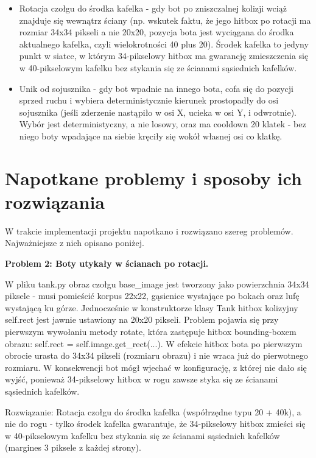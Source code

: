 \begin{itemize}
\item Rotacja czołgu do środka kafelka - gdy bot po zniszczalnej kolizji wciąż znajduje się wewnątrz ściany 
(np. wskutek faktu, że jego hitbox po rotacji ma rozmiar 34x34 pikseli a nie 20x20, pozycja bota jest wyciągana do środka 
aktualnego kafelka, czyli wielokrotności 40 plus 20). Środek kafelka to jedyny punkt w siatce, w którym 34-pikselowy hitbox 
ma gwarancję zmieszczenia się w 40-pikselowym kafelku bez stykania się ze ścianami sąsiednich kafelków.
\item Unik od sojusznika - gdy bot wpadnie na innego bota, cofa się do pozycji sprzed ruchu i wybiera deterministycznie 
kierunek prostopadły do osi sojusznika (jeśli zderzenie nastąpiło w osi X, ucieka w osi Y, i odwrotnie). Wybór 
jest deterministyczny, a nie losowy, oraz ma cooldown 20 klatek - bez niego boty wpadające na siebie kręciły się 
wokół własnej osi co klatkę.
\end{itemize}

\section{Napotkane problemy i sposoby ich rozwiązania}

W trakcie implementacji projektu napotkano i rozwiązano szereg problemów. Najważniejsze z nich opisano poniżej.
 
\textbf{Problem 2: Boty utykały w ścianach po rotacji.} 

W pliku tank.py obraz czołgu base\_image jest tworzony 
jako powierzchnia 34x34 piksele - musi pomieścić korpus 22x22, gąsienice wystające po bokach oraz lufę wystającą ku górze. 
Jednocześnie w konstruktorze klasy Tank hitbox kolizyjny self.rect jest jawnie ustawiony na 20x20 pikseli. 
Problem pojawia się przy pierwszym wywołaniu metody rotate, która zastępuje hitbox bounding-boxem obrazu: 
self.rect = self.image.get\_rect(...). W efekcie hitbox bota po pierwszym obrocie urasta do 34x34 pikseli 
(rozmiaru obrazu) i nie wraca już do pierwotnego rozmiaru. W konsekwencji bot mógł wjechać w konfigurację, 
z której nie dało się wyjść, ponieważ 34-pikselowy hitbox w rogu zawsze styka się 
ze ścianami sąsiednich kafelków. 

Rozwiązanie: Rotacja czołgu do środka kafelka (współrzędne typu 20 + 40k), a nie do rogu - tylko środek kafelka gwarantuje, 
że 34-pikselowy hitbox zmieści się w 40-pikselowym kafelku bez stykania się ze ścianami sąsiednich kafelków (margines 
3 piksele z każdej strony).
 
